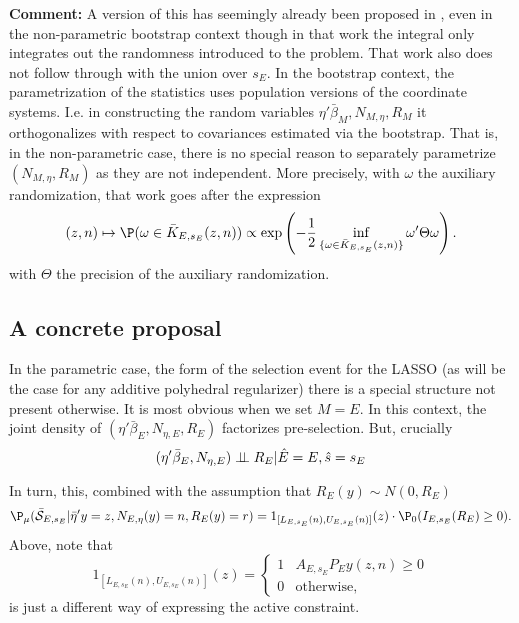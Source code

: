 \documentclass{article}
\newcommand{\OLS}{\bar{\beta}}
\begin{document}
        {\bf Comment:} A version of this
        has seemingly already been proposed in \cite{snigdha:jelena}, even in the
        non-parametric bootstrap context though in that work the
        integral only integrates out the randomness introduced to the problem. 
That work also does not follow through with the union over $s_E$. 
In the bootstrap context, the parametrization of the statistics 
        uses population versions of the coordinate systems. I.e. in constructing the
        random variables $\eta'\OLS_M, N_{M,\eta}, R_M$
        it orthogonalizes with respect
        to covariances estimated via the bootstrap.        That is, in the non-parametric case, there is no special reason to separately
        parametrize $(N_{M,\eta}, R_M)$ as they are not independent. 
 More precisely,
        with $\omega$ the auxiliary randomization, that work goes after
        the expression
        \begin{equation}
          \label{eq:LD:rand}
        (z,n) \mapsto \P(\omega \in \bar{K}_{E,s_E}(z,n)) \propto \exp\left(-\frac{1}{2} \inf_{\{\omega \in \bar{K}_{E,s_E}(z,n)\}}
        \omega' \Theta \omega\right).
        \end{equation}
        with $\Theta$ the precision of the auxiliary randomization.

        \subsection{A concrete proposal}

\newcommand{\indep}{\perp\kern-5pt\perp}

        In the parametric case, the form of the selection event for the
        LASSO (as will be the case for any additive polyhedral regularizer)
        there is a special structure not present otherwise. It is most obvious
        when we set $M=E$. In this context,
        the joint density of $(\eta'\OLS_E, N_{\eta,E}, R_E)$ factorizes
        pre-selection. But, crucially
        \begin{equation}
          \label{eq:cond:independence}
          (\eta'\OLS_E, N_{\eta,E})  \indep R_E | \hat{E}=E, \hat{s}=s_E
        \end{equation}
        
        In turn, this, combined with the assumption that $R_E(y) \sim N(0, R_E)$
        \begin{equation}
          \P_{\mu}(\bar{\cal S}_{E,s_E} | \bar{\eta}'y=z, N_{E,\eta}(y)=n, R_E(y)=r) =
          1_{[L_{E,s_E}(n), U_{E,s_E}(n)]}(z) \cdot \P_{0}(I_{E,s_E}(R_E) \geq 0).
        \end{equation}
        Above, note that
        $$
        1_{[L_{E,s_E}(n), U_{E,s_E}(n)]}(z) = \begin{cases} 1 & A_{E,s_E}P_Ey(z,n) \geq 0 \\
          0 & \text{otherwise,}
          \end{cases}
        $$
          is just a different way of expressing the active constraint.
          
\end{document}
